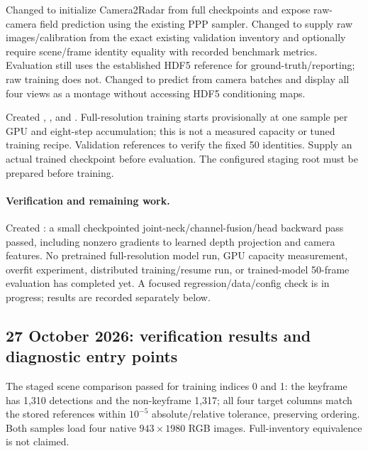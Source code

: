 \documentclass[11pt,a4paper]{article}
\begin{document}
Changed  to initialize Camera2Radar from full checkpoints and expose raw-camera field prediction using the existing PPP sampler. Changed  to supply raw images/calibration from the exact existing validation inventory and optionally require scene/frame identity equality with recorded benchmark metrics. Evaluation still uses the established HDF5 reference for ground-truth/reporting; raw training does not. Changed  to predict from camera batches and display all four views as a montage without accessing HDF5 conditioning maps.

Created , , and . Full-resolution training starts provisionally at one sample per GPU and eight-step accumulation; this is not a measured capacity or tuned training recipe. Validation references  to verify the fixed 50 identities. Supply an actual trained checkpoint before evaluation. The configured staging root must be prepared before training.

\paragraph{Verification and remaining work.}
Created : a small checkpointed joint-neck/channel-fusion/head backward pass passed, including nonzero gradients to learned depth projection and camera features. No pretrained full-resolution model run, GPU capacity measurement, overfit experiment, distributed training/resume run, or trained-model 50-frame evaluation has completed yet. A focused regression/data/config check is in progress; results are recorded separately below.

\subsection{27 October 2026: verification results and diagnostic entry points}
The staged scene comparison passed for training indices 0 and 1: the keyframe has 1,310 detections and the non-keyframe 1,317; all four target columns match the stored references within $10^{-5}$ absolute/relative tolerance, preserving ordering. Both samples load four native $943\times1980$ RGB images. Full-inventory equivalence is not claimed.
\end{document}
